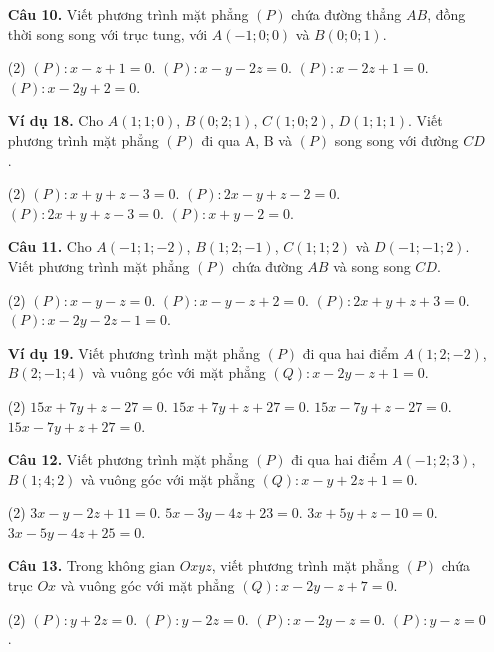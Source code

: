 \documentclass[12pt, a4paper]{article}
\begin{document}
\begin{enumerate}[label=\textbf{\arabic*.}, wide=0pt, leftmargin=*]
    \item[\textbf{Câu 10.}] Viết phương trình mặt phẳng \((P)\) chứa đường thẳng \(AB\), đồng thời song song với trục tung, với \(A(-1;0;0)\) và \(B(0;0;1)\).
    \begin{tasks}(2)
        \task \((P): x-z+1=0\).
        \task \((P): x-y-2z=0\).
        \task \((P): x-2z+1=0\).
        \task \((P): x-2y+2=0\).
    \end{tasks}
    
    \item[\textbf{Ví dụ 18.}] Cho \(A(1;1;0)\), \(B(0;2;1)\), \(C(1;0;2)\), \(D(1;1;1)\). Viết phương trình mặt phẳng \((P)\) đi qua A, B và \((P)\) song song với đường \(CD\).
    \begin{tasks}(2)
        \task \((P): x+y+z-3=0\).
        \task \((P): 2x-y+z-2=0\).
        \task \((P): 2x+y+z-3=0\).
        \task \((P): x+y-2=0\).
    \end{tasks}
    
    \item[\textbf{Câu 11.}] Cho \(A(-1;1;-2)\), \(B(1;2;-1)\), \(C(1;1;2)\) và \(D(-1;-1;2)\). Viết phương trình mặt phẳng \((P)\) chứa đường \(AB\) và song song \(CD\).
    \begin{tasks}(2)
        \task \((P): x-y-z=0\).
        \task \((P): x-y-z+2=0\).
        \task \((P): 2x+y+z+3=0\).
        \task \((P): x-2y-2z-1=0\).
    \end{tasks}
    
    \item[\textbf{Ví dụ 19.}] Viết phương trình mặt phẳng \((P)\) đi qua hai điểm \(A(1;2;-2)\), \(B(2;-1;4)\) và vuông góc với mặt phẳng \((Q): x-2y-z+1=0\).
    \begin{tasks}(2)
        \task \(15x+7y+z-27=0\).
        \task \(15x+7y+z+27=0\).
        \task \(15x-7y+z-27=0\).
        \task \(15x-7y+z+27=0\).
    \end{tasks}
    
    \item[\textbf{Câu 12.}] Viết phương trình mặt phẳng \((P)\) đi qua hai điểm \(A(-1;2;3)\), \(B(1;4;2)\) và vuông góc với mặt phẳng \((Q): x-y+2z+1=0\).
    \begin{tasks}(2)
        \task \(3x-y-2z+11=0\).
        \task \(5x-3y-4z+23=0\).
        \task \(3x+5y+z-10=0\).
        \task \(3x-5y-4z+25=0\).
    \end{tasks}
    
    \item[\textbf{Câu 13.}] Trong không gian \(Oxyz\), viết phương trình mặt phẳng \((P)\) chứa trục \(Ox\) và vuông góc với mặt phẳng \((Q): x-2y-z+7=0\).
    \begin{tasks}(2)
        \task \((P): y+2z=0\).
        \task \((P): y-2z=0\).
        \task \((P): x-2y-z=0\).
        \task \((P): y-z=0\).
    \end{tasks}
    

\end{enumerate}
\end{document}
